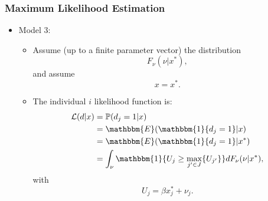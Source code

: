 \begin{frame}
\frametitle{Maximum Likelihood Estimation}

\begin{itemize}
	\item Model 3:
	\begin{itemize}
		\item Assume (up to a finite parameter vector) the distribution
		\begin{equation*}
		F_{\nu}(\nu|x^{*}),
		\end{equation*}
		and assume
		\begin{equation*}
		x = x^{*}.
		\end{equation*}
		\item The individual $i$ likelihood function is:
		\begin{equation*}
		\begin{split}
		\mathcal{L}(d|x)&=\mathbb{P}(d_{j}=1|x)\\
		&=\mathbbm{E}(\mathbbm{1}\{d_{j}=1\}|x)\\
		&=\mathbbm{E}(\mathbbm{1}\{d_{j}=1\}|x^{*})\\
		&=\int_{\nu}\mathbbm{1}\{U_{j}\geq\max_{j'\in J}\{U_{j'}\}\}dF_{\nu}(\nu|x^{*}),\\
		\end{split}
		\end{equation*}
		with
		\begin{equation*}
		U_{j}=\beta x^{*}_{j}+\nu_{j}.
		\end{equation*}
	\end{itemize}
\end{itemize}
\end{frame}
